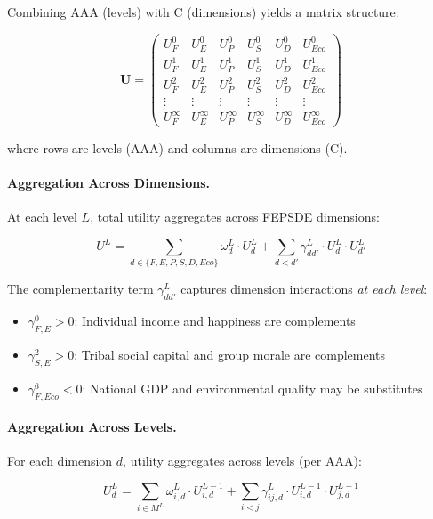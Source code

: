 Combining AAA (levels) with C (dimensions) yields a matrix structure:

\begin{equation}
\mathbf{U} = \begin{pmatrix}
U^0_F & U^0_E & U^0_P & U^0_S & U^0_D & U^0_{Eco} \\
U^1_F & U^1_E & U^1_P & U^1_S & U^1_D & U^1_{Eco} \\
U^2_F & U^2_E & U^2_P & U^2_S & U^2_D & U^2_{Eco} \\
\vdots & \vdots & \vdots & \vdots & \vdots & \vdots \\
U^{\infty}_F & U^{\infty}_E & U^{\infty}_P & U^{\infty}_S & U^{\infty}_D & U^{\infty}_{Eco}
\end{pmatrix}
\end{equation}

where rows are levels (AAA) and columns are dimensions (C).

\paragraph{Aggregation Across Dimensions.}

At each level $L$, total utility aggregates across FEPSDE dimensions:

\begin{equation}
U^L = \sum_{d \in \{F, E, P, S, D, Eco\}} \omega^L_d \cdot U^L_d + \sum_{d < d'} \gamma^L_{dd'} \cdot U^L_d \cdot U^L_{d'}
\end{equation}

The complementarity term $\gamma^L_{dd'}$ captures dimension interactions \textit{at each level}:
\begin{itemize}[nosep]
\item $\gamma^0_{F,E} > 0$: Individual income and happiness are complements
\item $\gamma^2_{S,E} > 0$: Tribal social capital and group morale are complements
\item $\gamma^6_{F,Eco} < 0$: National GDP and environmental quality may be substitutes
\end{itemize}

\paragraph{Aggregation Across Levels.}

For each dimension $d$, utility aggregates across levels (per AAA):

\begin{equation}
U^L_d = \sum_{i \in M^L} \omega^L_{i,d} \cdot U^{L-1}_{i,d} + \sum_{i < j} \gamma^L_{ij,d} \cdot U^{L-1}_{i,d} \cdot U^{L-1}_{j,d}
\end{equation}

